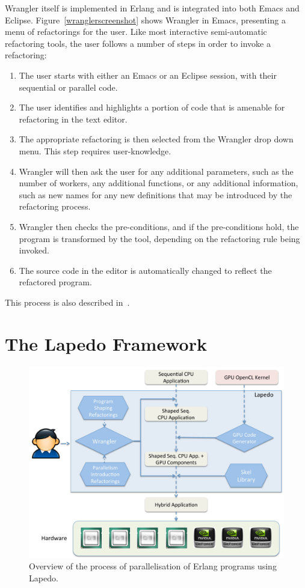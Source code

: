 \documentclass[final]{jfp1}
\newcommand{\lapedo}{\xspace{\sc Lapedo}\xspace}
\newcommand{\Lapedo}{\lapedo}
\begin{document}
Wrangler itself is implemented in Erlang and is integrated into both Emacs and Eclipse.
Figure~\ref{wranglerscreenshot} shows Wrangler in Emacs, presenting a menu of refactorings for the user.
Like most interactive semi-automatic refactoring tools, 
the user follows a number of steps in order to invoke a refactoring:
\begin{enumerate}
\item The user starts with either an Emacs or an Eclipse session, with their sequential or parallel code.
\item The user identifies and highlights a portion of code that is amenable for refactoring in the text editor.
\item The appropriate refactoring is then selected from the Wrangler drop down menu. This step requires user-knowledge.
\item Wrangler will then ask the user for any additional parameters, such as the number of workers, any additional functions, or any additional information, such as new names for any new definitions that may be introduced by the refactoring process.
\item Wrangler then checks the pre-conditions, and if the pre-conditions hold, the program is transformed by the tool, depending on the refactoring rule  being invoked.
\item The source code in the editor is automatically changed to reflect the refactored program.
\end{enumerate}
This process is also described in~\cite{BDH+13}.

\section{The \Lapedo{} Framework} \label{lapedoframe}
\begin{figure}[t]
\begin{center}
\includegraphics[width=0.9\linewidth]{figures/lapedo.pdf}
\caption{Overview of the process of parallelisation of Erlang programs
using \Lapedo.}
\label{fig:lapedoMethodology}
\end{center}
\end{figure}
\end{document}
